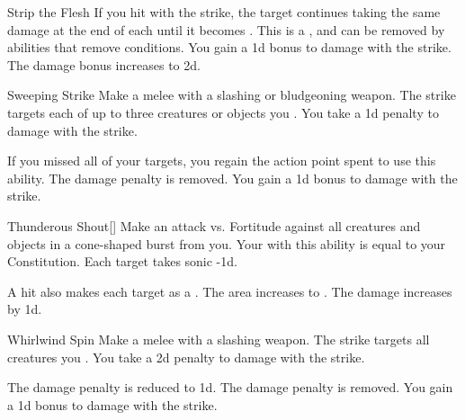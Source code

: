 {\begin{ability}{Strip the Flesh}
                \rankline
                 If you hit with the strike, the target continues taking the same damage at the end of each  until it becomes .
                This is a , and can be removed by abilities that remove conditions.
                 You gain a \plus1d bonus to damage with the strike.
                 The damage bonus increases to \plus2d.
            \end{ability}

            \begin{ability}{Sweeping Strike}
                Make a melee  with a slashing or bludgeoning weapon.
                The strike targets each of up to three creatures or objects you .
                You take a \minus1d penalty to damage with the strike.

                \rankline
                 If you missed all of your targets, you regain the action point spent to use this ability.
                 The damage penalty is removed.
                 You gain a \plus1d bonus to damage with the strike.
            \end{ability}

            \begin{ability}{Thunderous Shout}[]
                Make an attack vs. Fortitude against all creatures and objects in a \areamed cone-shaped burst from you.
                Your  with this ability is equal to your Constitution.
                \hit Each target takes sonic  -1d.

                \rankline
                 A hit also makes each target  as a .
                 The area increases to \arealarge.
                 The damage increases by \plus1d.
            \end{ability}

            \begin{ability}{Whirlwind Spin}
                Make a melee  with a slashing weapon.
                The strike targets all creatures you .
                You take a \minus2d penalty to damage with the strike.

                \rankline
                 The damage penalty is reduced to \minus1d.
                 The damage penalty is removed.
                 You gain a \plus1d bonus to damage with the strike.
            \end{ability}
        }

